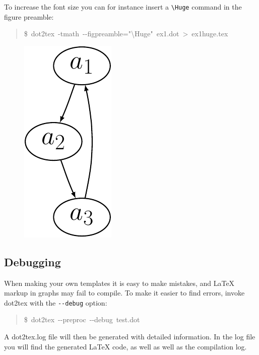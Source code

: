 \documentclass[10pt,a4paper,english]{article}
\begin{document}
To increase the font size you can for instance insert a \texttt{{\textbackslash}Huge} command in the figure preamble:
\begin{quote}{\ttfamily \raggedright \noindent
{\$}~dot2tex~-tmath~-{}-figpreamble="{\textbackslash}Huge"~ex1.dot~>~ex1huge.tex
}\end{quote}
\begin{figure}[H]
\centering

\includegraphics{pdf/ex1huge}
\end{figure}



\hypertarget{debugging}{}
\subsection*{Debugging}
\label{debugging}

When making your own templates it is easy to make mistakes, and LaTeX markup in graphs may fail to compile. To make it easier to find errors, invoke dot2tex with the \texttt{-{}-debug} option:
\begin{quote}{\ttfamily \raggedright \noindent
{\$}~dot2tex~-{}-preproc~-{}-debug~test.dot
}\end{quote}

A dot2tex.log file will then be generated with detailed information. In the log file you will find the generated LaTeX code, as well as well as the compilation log.


\end{document}
